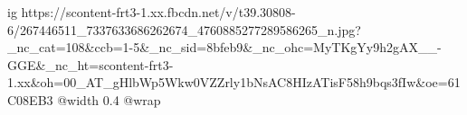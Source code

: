  
 
 
 
 

\ifcmt
  ig https://scontent-frt3-1.xx.fbcdn.net/v/t39.30808-6/267446511_7337633686262674_4760885277289586265_n.jpg?_nc_cat=108&ccb=1-5&_nc_sid=8bfeb9&_nc_ohc=MyTKgYy9h2gAX__-GGE&_nc_ht=scontent-frt3-1.xx&oh=00_AT_gHlbWp5Wkw0VZZrly1bNsAC8HIzATisF58h9bqs3fIw&oe=61C08EB3
  @width 0.4
  @wrap 
\fi
